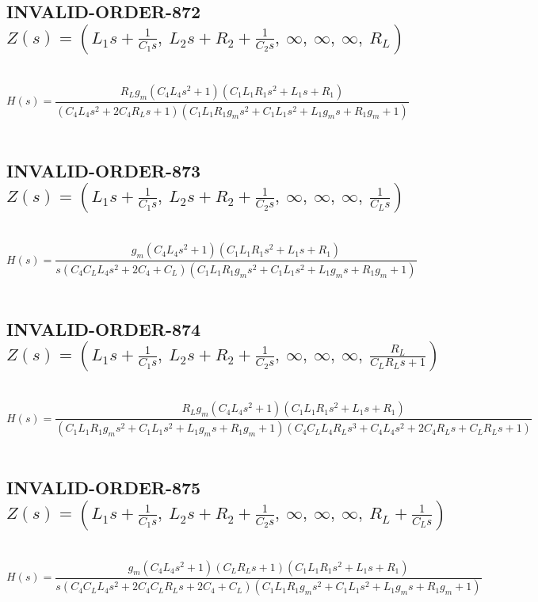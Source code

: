 \documentclass{article}
\begin{document}
\subsection{INVALID-ORDER-872 $Z(s) = \left( L_{1} s + \frac{1}{C_{1} s}, \  L_{2} s + R_{2} + \frac{1}{C_{2} s}, \  \infty, \  \infty, \  \infty, \  R_{L}\right)$ } \ 
\textbf{\[H(s) = \frac{R_{L} g_{m} \left(C_{4} L_{4} s^{2} + 1\right) \left(C_{1} L_{1} R_{1} s^{2} + L_{1} s + R_{1}\right)}{\left(C_{4} L_{4} s^{2} + 2 C_{4} R_{L} s + 1\right) \left(C_{1} L_{1} R_{1} g_{m} s^{2} + C_{1} L_{1} s^{2} + L_{1} g_{m} s + R_{1} g_{m} + 1\right)}\] } \ 
\subsection{INVALID-ORDER-873 $Z(s) = \left( L_{1} s + \frac{1}{C_{1} s}, \  L_{2} s + R_{2} + \frac{1}{C_{2} s}, \  \infty, \  \infty, \  \infty, \  \frac{1}{C_{L} s}\right)$ } \ 
\textbf{\[H(s) = \frac{g_{m} \left(C_{4} L_{4} s^{2} + 1\right) \left(C_{1} L_{1} R_{1} s^{2} + L_{1} s + R_{1}\right)}{s \left(C_{4} C_{L} L_{4} s^{2} + 2 C_{4} + C_{L}\right) \left(C_{1} L_{1} R_{1} g_{m} s^{2} + C_{1} L_{1} s^{2} + L_{1} g_{m} s + R_{1} g_{m} + 1\right)}\] } \ 
\subsection{INVALID-ORDER-874 $Z(s) = \left( L_{1} s + \frac{1}{C_{1} s}, \  L_{2} s + R_{2} + \frac{1}{C_{2} s}, \  \infty, \  \infty, \  \infty, \  \frac{R_{L}}{C_{L} R_{L} s + 1}\right)$ } \ 
\textbf{\[H(s) = \frac{R_{L} g_{m} \left(C_{4} L_{4} s^{2} + 1\right) \left(C_{1} L_{1} R_{1} s^{2} + L_{1} s + R_{1}\right)}{\left(C_{1} L_{1} R_{1} g_{m} s^{2} + C_{1} L_{1} s^{2} + L_{1} g_{m} s + R_{1} g_{m} + 1\right) \left(C_{4} C_{L} L_{4} R_{L} s^{3} + C_{4} L_{4} s^{2} + 2 C_{4} R_{L} s + C_{L} R_{L} s + 1\right)}\] } \ 
\subsection{INVALID-ORDER-875 $Z(s) = \left( L_{1} s + \frac{1}{C_{1} s}, \  L_{2} s + R_{2} + \frac{1}{C_{2} s}, \  \infty, \  \infty, \  \infty, \  R_{L} + \frac{1}{C_{L} s}\right)$ } \ 
\textbf{\[H(s) = \frac{g_{m} \left(C_{4} L_{4} s^{2} + 1\right) \left(C_{L} R_{L} s + 1\right) \left(C_{1} L_{1} R_{1} s^{2} + L_{1} s + R_{1}\right)}{s \left(C_{4} C_{L} L_{4} s^{2} + 2 C_{4} C_{L} R_{L} s + 2 C_{4} + C_{L}\right) \left(C_{1} L_{1} R_{1} g_{m} s^{2} + C_{1} L_{1} s^{2} + L_{1} g_{m} s + R_{1} g_{m} + 1\right)}\] } \ 
\end{document}
